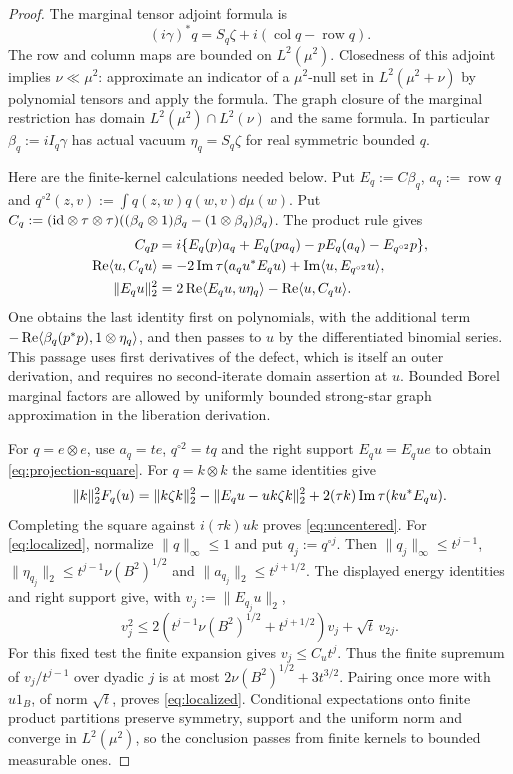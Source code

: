 \begin{proof}
The marginal tensor adjoint formula is
\[
 (i\gamma)^*q=S_q\zeta+i(\operatorname{col}q-\operatorname{row}q).
\]
The row and column maps are bounded on $L^2(\mu^2)$.
Closedness of this adjoint implies $\nu\ll\mu^2$: approximate an indicator of a $\mu^2$-null set in $L^2(\mu^2+\nu)$ by polynomial tensors and apply the formula.
The graph closure of the marginal restriction has domain $L^2(\mu^2)\cap L^2(\nu)$ and the same formula.
In particular $\beta_q:=iI_q\gamma$ has actual vacuum $\eta_q=S_q\zeta$ for real symmetric bounded $q$.

Here are the finite-kernel calculations needed below.
Put $E_q:=C\beta_q$, $a_q:=\operatorname{row}q$ and $q^{\circ2}(z,v):=\int q(z,w)q(w,v)\dd\mu(w)$.
Put $C_q:=(\mathrm{id}\otimes\tau\otimes\tau)((\beta_q\otimes1)\beta_q-(1\otimes\beta_q)\beta_q)$.
The product rule gives
\begin{align*}
 C_qp&=i\{E_q(p)a_q+E_q(pa_q)-pE_q(a_q)-E_{q^{\circ2}}p\},\\
 \operatorname{Re}\langle u,C_qu\rangle
 &=-2\operatorname{Im}\tau(a_qu^*E_qu)+\operatorname{Im}\langle u,E_{q^{\circ2}}u\rangle,\\
 \|E_qu\|_2^2&=2\operatorname{Re}\langle E_qu,u\eta_q\rangle-\operatorname{Re}\langle u,C_qu\rangle.
\end{align*}
One obtains the last identity first on polynomials, with the additional term $-\operatorname{Re}\langle\beta_q(p^*p),1\otimes\eta_q\rangle$, and then passes to $u$ by the differentiated binomial series.
This passage uses first derivatives of the defect, which is itself an outer derivation, and requires no second-iterate domain assertion at $u$.
Bounded Borel marginal factors are allowed by uniformly bounded strong-star graph approximation in the liberation derivation.

For $q=e\otimes e$, use $a_q=te$, $q^{\circ2}=tq$ and the right support $E_qu=E_qu e$ to obtain \eqref{eq:projection-square}.
For $q=k\otimes k$ the same identities give
\[
 \|k\|_2^2F_q(u)=\|k\zeta k\|_2^2-\|E_qu-uk\zeta k\|_2^2
 +2(\tau k)\operatorname{Im}\tau(ku^*E_qu).
\]
Completing the square against $i(\tau k)uk$ proves \eqref{eq:uncentered}.
For \eqref{eq:localized}, normalize $\|q\|_\infty\le1$ and put $q_j:=q^{\circ j}$.
Then $\|q_j\|_\infty\le t^{j-1}$, $\|\eta_{q_j}\|_2\le t^{j-1}\nu(B^2)^{1/2}$ and $\|a_{q_j}\|_2\le t^{j+1/2}$.
The displayed energy identities and right support give, with $v_j:=\|E_{q_j}u\|_2$,
\[
 v_j^2\le2(t^{j-1}\nu(B^2)^{1/2}+t^{j+1/2})v_j+\sqrt t\,v_{2j}.
\]
For this fixed test the finite expansion gives $v_j\le C_ut^j$.
Thus the finite supremum of $v_j/t^{j-1}$ over dyadic $j$ is at most $2\nu(B^2)^{1/2}+3t^{3/2}$.
Pairing once more with $u1_B$, of norm $\sqrt t$, proves \eqref{eq:localized}.
Conditional expectations onto finite product partitions preserve symmetry, support and the uniform norm and converge in $L^2(\mu^2)$, so the conclusion passes from finite kernels to bounded measurable ones.
\end{proof}

